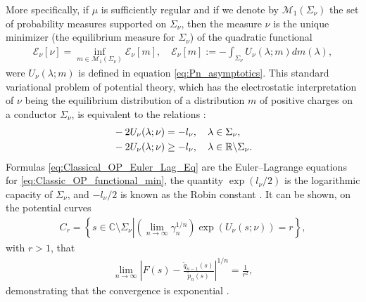 \documentclass[english,12pt]{ttuthes}
\begin{document}
More specifically, if $\mu$ is sufficiently regular
\cite{Simon:IPI:07,Saff_Totik:97} and if we denote by 
$\mathcal{M}_1(\Sigma_\nu)$ the set of probability measures supported on
$\Sigma_\nu$, then the measure $\nu$ is the unique minimizer (the equilibrium
measure for $\Sigma_\nu$) of the quadratic functional  
%
\begin{align}\label{eq:Classic_OP_functional_min}
  \mathcal{E}_{\nu}[\nu]=\inf_{m\in\mathcal{M}_1(\Sigma_\nu)}\mathcal{E}_{\nu}[m],\quad
  \mathcal{E}_{\nu}[m]:=-\int_{\Sigma_\nu}U_\nu(\lambda;m)dm(\lambda),
\end{align}
%
were $U_\nu(\lambda;m)$ is defined in equation \eqref{eq:Pn_asymptotics}. This
standard variational problem of potential theory, which has the
electrostatic interpretation of $\nu$ being the equilibrium distribution
of a distribution $m$ of positive charges on a conductor $\Sigma_\nu$, is
equivalent to the relations \cite{Saff_Totik:97}:
%
\begin{align}\label{eq:Classical_OP_Euler_Lag_Eq}
  &-2U_\nu(\lambda;\nu)=-l_{\nu},\quad \lambda\in\Sigma_\nu,\\
  &-2U_\nu(\lambda;\nu)\geq-l_{\nu},\quad \lambda\in\mathbb{R}\text{\textbackslash}\Sigma_\nu.\notag
\end{align}
%
Formulas \eqref{eq:Classical_OP_Euler_Lag_Eq} are the Euler--Lagrange
equations for \eqref{eq:Classic_OP_functional_min}, the quantity
$\exp(l_{\nu}/2)$ is the logarithmic capacity of $\Sigma_\nu$, and
$-l_{\nu}/2$ is known as the Robin constant \cite{Pastur:JAT:06}.
It can be shown, on the potential curves
%
\begin{align}
  C_r=\left\{s\in\mathbb{C}\text{\textbackslash}\Sigma_\nu\left.\right\vert
      \left(\lim_{n\to\infty}\gamma_n^{1/n}\right)\exp(U_\nu(s;\nu))=r \right\}, 
\end{align}
%
with $r>1$, that
%
\begin{align}
  \lim_{n\to\infty}\left|F(s)-\frac{\tilde{q}_{n-1}(s)}{\tilde{p}_n(s)}\right|^{1/n}=\frac{1}{r^2},
\end{align}
%
demonstrating that the convergence is exponential
\cite{Assche:SAT:2006}. 
\end{document}
